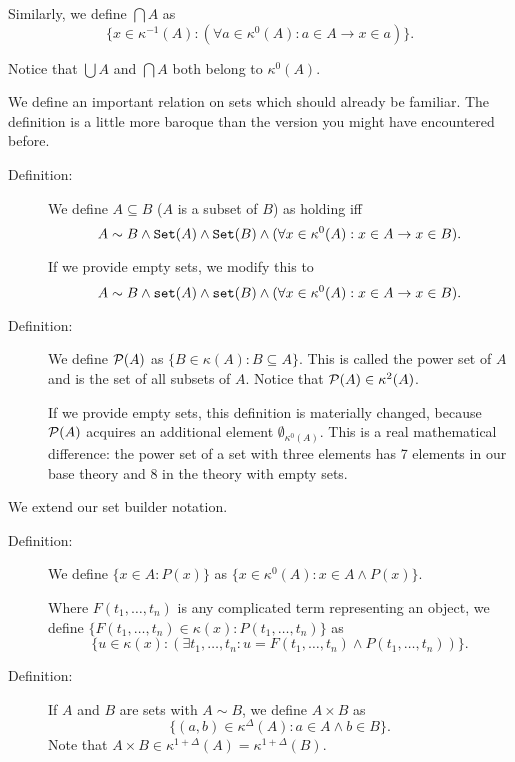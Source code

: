 \documentclass[12pt]{article}
\begin{document}
\begin{description}
Similarly, we define $\bigcap A$ as $$\{x \in \kappa^{-1}(A):(\forall a \in \kappa^0(A):a \in A \rightarrow x \in a)\}.$$

Notice that $\bigcup A$ and $\bigcap A$ both belong to $\kappa^0(A)$.

\end{description}

We define an important relation on sets which should already be familiar.  The definition is a little more baroque than the version you might have encountered before.

\begin{description}

\item[Definition:]  We define $A \subseteq B$ ($A$ is a subset of $B$) as holding iff $$A \sim B \wedge {\tt Set}(A) \wedge {\tt Set}(B)\wedge (\forall x \in \kappa^0(A):x \in A \rightarrow x \in B).$$

If we provide empty sets, we modify this to  $$A \sim B \wedge {\tt set}(A) \wedge {\tt set}(B)\wedge (\forall x \in \kappa^0(A):x \in A \rightarrow x \in B).$$

\item[Definition:]  We define ${\cal P}(A)$ as $\{B \in \kappa(A):B \subseteq A\}$.  This is called the power set of $A$ and is the set of all subsets of $A$.  Notice that ${\cal P}(A) \in \kappa^2(A)$.

If we provide empty sets, this definition is materially changed, because ${\cal P}(A)$ acquires an additional element $\emptyset_{\kappa^0(A)}$.  This is a real mathematical difference:  the power set of a set with three elements has 7 elements in our base theory and 8 in the theory with empty sets.

\end{description}

We extend our set builder notation.

\begin{description}

\item[Definition:]  We define $\{x \in A:P(x)\}$ as $\{x \in \kappa^0(A):x \in A \wedge P(x)\}$.

Where $F(t_1,\ldots,t_n)$ is any complicated term representing an object, we define $\{F(t_1,\ldots,t_n) \in \kappa(x):P(t_1,\ldots,t_n)\}$ as $$\{u \in \kappa(x):(\exists t_1,\ldots,t_n:u = F(t_1,\ldots,t_n) \wedge P(t_1,\ldots,t_n))\}.$$

\item[Definition:]  If $A$ and $B$ are sets with $A \sim B$, we define $A \times B$ as $$\{(a,b) \in \kappa^{\Delta}(A):a \in A \wedge b \in B\}.$$  Note that $A \times B \in \kappa^{1+\Delta}(A) = \kappa^{1+\Delta}(B)$.

\end{description}
\end{document}

